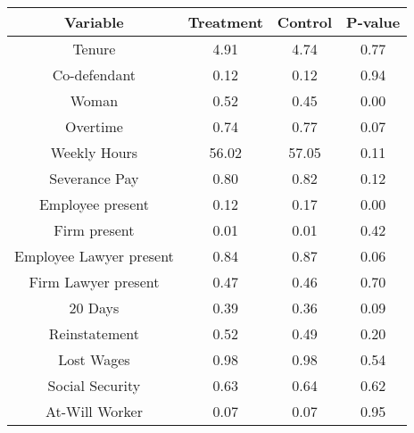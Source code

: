  \begin{tabular}{@{\extracolsep{5pt}} cccc} 
\toprule
Variable & Treatment & Control & P-value \\ 
\midrule
\midrule
Tenure &  4.91 &  4.74 & 0.77 \\ 
Co-defendant &  0.12 &  0.12 & 0.94 \\ 
Woman &  0.52 &  0.45 & 0.00 \\ 
Overtime &  0.74 &  0.77 & 0.07 \\ 
Weekly Hours & 56.02 & 57.05 & 0.11 \\ 
Severance Pay &  0.80 &  0.82 & 0.12 \\ 
Employee present &  0.12 &  0.17 & 0.00 \\ 
Firm present &  0.01 &  0.01 & 0.42 \\ 
Employee Lawyer present &  0.84 &  0.87 & 0.06 \\ 
Firm Lawyer present &  0.47 &  0.46 & 0.70 \\ 
20 Days &  0.39 &  0.36 & 0.09 \\ 
Reinstatement &  0.52 &  0.49 & 0.20 \\ 
Lost Wages &  0.98 &  0.98 & 0.54 \\ 
Social Security &  0.63 &  0.64 & 0.62 \\ 
At-Will Worker &  0.07 &  0.07 & 0.95 \\ 
\bottomrule
\end{tabular} 
